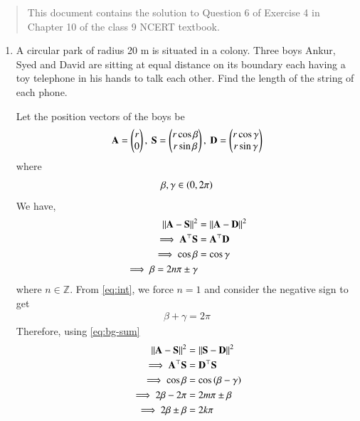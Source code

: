 \documentclass[journal,12pt,twocolumn]{IEEEtran}
\begin{document}
\begin{abstract}
    This document contains the solution to Question 6 of 
    Exercise 4 in Chapter 10 of the class 9 NCERT textbook.
\end{abstract}

\begin{enumerate}
    \item A circular park of radius 20 m is situated in a colony. Three boys 
    Ankur, Syed and David are sitting at equal distance on its boundary each 
    having a toy telephone in his hands to talk each other. Find the length of 
    the string of each phone.

    \solution Let the position vectors of the boys be
    \begin{align}
        \mathbf{A} = \begin{pmatrix}r\\0\end{pmatrix},\ \mathbf{S} = \begin{pmatrix}r\cos\beta\\r\sin\beta\end{pmatrix},\ \mathbf{D} = \begin{pmatrix}r\cos\gamma\\r\sin\gamma\end{pmatrix}
        \label{eq:pos-vec-def}
    \end{align}
    where
    \begin{align}
        \beta, \gamma \in \left(0,2\pi\right)
        \label{eq:int}
    \end{align}
    We have,
    \begin{align}
        \left\lVert\mathbf{A}-\mathbf{S}\right\rVert^2 &= \left\lVert\mathbf{A}-\mathbf{D}\right\rVert^2 \\
        \implies \mathbf{A}^\top\mathbf{S} &= \mathbf{A}^\top\mathbf{D} \\
        \implies \cos\beta &= \cos\gamma \\
        \implies \beta = 2n\pi \pm \gamma
        \label{eq:bg-gen}
    \end{align}
    where $n \in \mathbb{Z}$. From \eqref{eq:int}, we force $n = 1$
    and consider the negative sign to get
    \begin{align}
        \beta+\gamma = 2\pi
        \label{eq:bg-sum}
    \end{align}
    Therefore, using \eqref{eq:bg-sum}
    \begin{align}
        \norm{\vec{A}-\vec{S}}^2 &= \norm{\vec{S}-\vec{D}}^2 \\
        \implies \vec{A}^\top\vec{S} &= \vec{D}^\top\vec{S} \\
        \implies \cos\beta &= \cos\brak{\beta-\gamma} \\
        \implies 2\beta-2\pi &= 2m\pi\pm\beta \\
        \implies 2\beta\pm\beta &= 2k\pi
        \label{eq:beta-eqn}

\end{align}
\end{enumerate}
\end{document}
